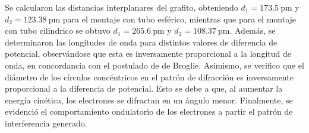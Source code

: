 Se calcularon las distancias interplanares del grafito, obteniendo
\(d_{1} = \qty{173.5}{\pico\metre}\) y \(d_{2} = \qty{123.38}{\pico\metre}\)
para el montaje con tubo esférico, mientras que para el montaje con tubo
cilíndrico se obtuvo \(d_{1} = \qty{265.6}{\pico\metre}\) y \(d_{2} = \qty{108.37}{\pico\metre}\).
Además, se determinaron las longitudes de onda para distintos valores de
diferencia de potencial, observándose que esta es inversamente proporcional
a la longitud de onda, en concordancia con el postulado de de Broglie.
Asimismo, se verifico que el diámetro de los círculos concéntricos en el patrón
de difracción es inversamente proporcional a la diferencia de potencial.
Esto se debe a que, al aumentar la energía cinética, los electrones se difractan
en un ángulo menor.
Finalmente, se evidenció el comportamiento ondulatorio de los electrones
a partir el patrón de interferencia generado.
